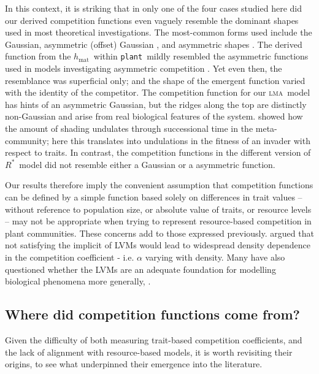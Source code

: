 \documentclass[a4paper,11pt]{article}
\newcommand{\Rstar}{\ensuremath{R^*}}
\newcommand{\plant}{{\tt plant}}
\newcommand{\hmat}{\ensuremath{h_{\text{mat}}}}
\newcommand{\lma}{\textsc{lma}}
\begin{document}
In this context, it is striking that in only one of the four cases studied here did our derived competition functions even vaguely resemble the dominant shapes used in most theoretical investigations. The most-common forms used include the Gaussian, asymmetric (offset) Gaussian \citep{Roughgarden-1979}, and asymmetric shapes \citep[e.g.][]{Kisdi-1999, Law-1997}. The derived function from the \hmat\ within \plant\ mildly resembled the asymmetric functions used in models investigating asymmetric competition \citep{Law-1997, Geritz-1999, Kisdi-1999, Calcagno-2006}. Yet even then, the resemblance was superficial only; and the shape of the emergent function varied with the identity of the competitor. The competition function for our \lma\ model has hints of an asymmetric Gaussian, but the ridges along the top are distinctly non-Gaussian and arise from real biological features of the system. \citet{Falster-2011} showed how the amount of shading undulates through successional time in the meta-community; here this translates into undulations in the fitness of an invader with respect to traits. In contrast, the competition functions in the different version of \Rstar\ model did not resemble either a Gaussian or a asymmetric function.

Our results therefore imply the convenient assumption that competition functions can be defined by a simple function based solely on differences in trait values -- without reference to population size, or absolute value of traits, or resource levels -- may not be appropriate when trying to represent resource-based competition in plant communities. These concerns add to those expressed previously. \citet{Abrams-1980} argued that not satisfying the implicit of LVMs would lead to widespread density dependence in the competition coefficient - i.e. $\alpha$ varying with density. Many have also questioned whether the LVMs are an adequate foundation for modelling biological phenomena more generally, \citep[e.g.][]{Andrewartha-1953, Neill-1974, Abrams-1975, Wangersky-1978,Abrams-1980, Tilman-1987, Abrams-2008}.

\subsection{Where did competition functions come from?}

Given the difficulty of both measuring trait-based competition coefficients, and the lack of alignment with resource-based models, it is worth revisiting their origins, to see what underpinned their emergence into the literature.
\end{document}
